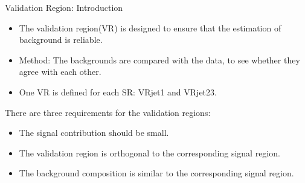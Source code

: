 \documentclass[mathserif,serif]{beamer}
\begin{document}
\begin{frame}{Validation Region: Introduction}
\begin{itemize}
\item The validation region(VR) is designed to ensure that the estimation of background is reliable.
\item Method: The backgrounds are compared with the data, to see whether they agree with each other.
\item One VR is defined for each SR: VRjet1 and VRjet23.
\end{itemize}
There are three requirements for the validation regions:
\begin{itemize}
\item The signal contribution should be small.
\item The validation region is orthogonal to the corresponding signal region.
\item The background composition is similar to the corresponding signal region.
\end{itemize}
\end{frame}
\end{document}
